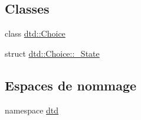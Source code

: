 \subsection*{Classes}
\begin{DoxyCompactItemize}
\item 
class \hyperlink{classdtd_1_1_choice}{dtd::Choice}
\item 
struct \hyperlink{structdtd_1_1_choice_1_1___state}{dtd::Choice::\_\-State}
\end{DoxyCompactItemize}
\subsection*{Espaces de nommage}
\begin{DoxyCompactItemize}
\item 
namespace \hyperlink{namespacedtd}{dtd}
\end{DoxyCompactItemize}
